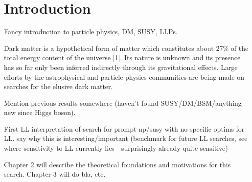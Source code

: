 \chapter{Introduction}
\label{chap:introduction}



Fancy introduction to particle physics, DM, SUSY, LLPs.

Dark matter is a hypothetical form of matter which constitutes about 27\% of 
the total energy content of the universe [1]. Its nature is unknown and its 
presence has so far only been inferred indirectly through its gravitational 
effects. Large efforts by the astrophysical and particle physics communities 
are 
being made on searches for the elusive dark matter.

Mention previous results somewhere (haven't found SUSY/DM/BSM/anything new 
since Higgs boson).

First LL interpretation of search for prompt np/susy with no specific optims 
for LL. 
say why this is 
interesting/important (benchmark for future LL searches, see where sensitivity 
to LL currently lies - surprisingly already quite sensitive)

Chapter 2 will describe 
the theoretical foundations and motivations for this search. Chapter 3 will do 
bla, etc.


